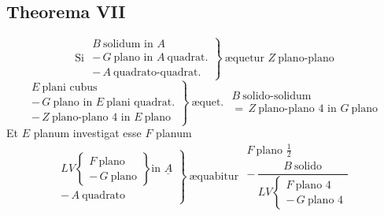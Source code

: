 \documentclass[11pt,a4paper]{article}
\begin{document}
\subsection*{Theorema VII}

\[ \text{Si } \left.\begin{array}{l} B\ \text{solidum in } A \\ -\,G\ \text{plano in } A\ \text{quadrat.} \\ -\,A\ \text{quadrato-quadrat.} \end{array}\right\}\ \text{æquetur } Z\ \text{plano-plano} \]
\marginal{$\equiv$}
\[ \left.\begin{array}{l} E\ \text{plani cubus} \\ -\,G\ \text{plano in } E\ \text{plani quadrat.} \\ -\,Z\ \text{plano-plano } 4 \text{ in } E\ \text{plano} \end{array}\right\}\ \text{æquet. } \begin{array}{l} B\ \text{solido-solidum} \\ =\,Z\ \text{plano-plano } 4 \text{ in } G\ \text{plano} \end{array} \]
Et $E$ planum investigat esse $F$ planum
\[ \left.\begin{array}{l} LV \left\{\begin{array}{l} F\ \text{plano} \\ -\,G\ \text{plano} \end{array}\right\} \text{in } \underline{A} \\ -\,A\ \text{quadrato} \end{array}\right\}\ \text{æquabitur } \begin{array}{l} F\ \text{plano } \frac{1}{2} \\ -\,\dfrac{B\ \text{solido}}{LV \left\{\begin{array}{l} F\ \text{plano } 4 \\ -\,G\ \text{plano } 4 \end{array}\right.} \end{array} \]

\end{document}
